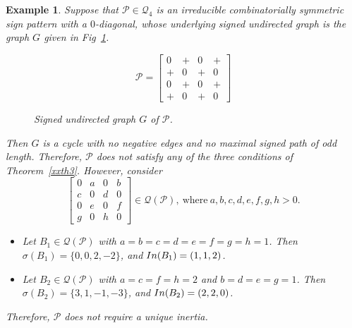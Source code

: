 \documentclass[10pt,a4paper]{amsart}
\newtheorem{eg}{Example}[section]
\numberwithin{equation}{section}
\def\In{{\rm In}}
\begin{document}
\begin{eg}\label{egxx0.6} Suppose that $\mathcal{P}\in \mathcal{Q}_4$ is an irreducible combinatorially symmetric sign pattern with a $0$-diagonal, whose underlying signed undirected graph is the graph $G$ given in Fig~\ref{xfig3.37}.
	\begin{figure}[H]
		\centering
		\begin{minipage}{.45\textwidth}
			\vspace{-1cm}
			\[
			\mathcal{P}=
			\begin{bmatrix}
				0 & + & 0 & + \\
				+ & 0 & + & 0 \\
				0 & + & 0 & + \\
				+ & 0 & + & 0
			\end{bmatrix}
			\]
		\end{minipage}
		\hspace{0.05\textwidth}
		\begin{minipage}{.45\textwidth}
			\centering
			\tikzset{node distance=1cm}
			\caption{Signed undirected graph $ G$ of $\mathcal{P}$.}
			\label{xfig3.37}
		\end{minipage}
	\end{figure}
	
	Then $G$ is a cycle with no negative edges and no maximal signed path of odd length. Therefore, $\mathcal{P}$ does not satisfy any of the three conditions
	of Theorem~\ref{xxth3}. However, consider	$$\begin{bmatrix}
		0&a&0&b\\ c&0&d&0\\ 0&e&0&f\\ g&0&h&0
	\end{bmatrix}\in \mathcal{Q}(\mathcal{P}), ~\text{where}~ a,b,c,d,e,f,g,h>0.$$ \begin{itemize}
		\item[i.] Let $B_1 \in \mathcal{Q}(\mathcal{P})$ with $a = b = c = d = e = f = g = h = 1$. Then $\sigma(B_1) = \{0, 0, 2, -2\}$, and $\In(B_1) = (1, 1, 2)$.
		\item[ii.] Let $B_2 \in \mathcal{Q}(\mathcal{P})$ with $a = c = f = h = 2$ and $b=d=e=g = 1$. Then $\sigma(B_2) = \{3, 1, -1, -3\}$, and $\In(B_2) = (2, 2, 0)$.
	\end{itemize}
	
	Therefore, $\mathcal{P}$ does not require a unique inertia.
\end{eg}
\end{document}
